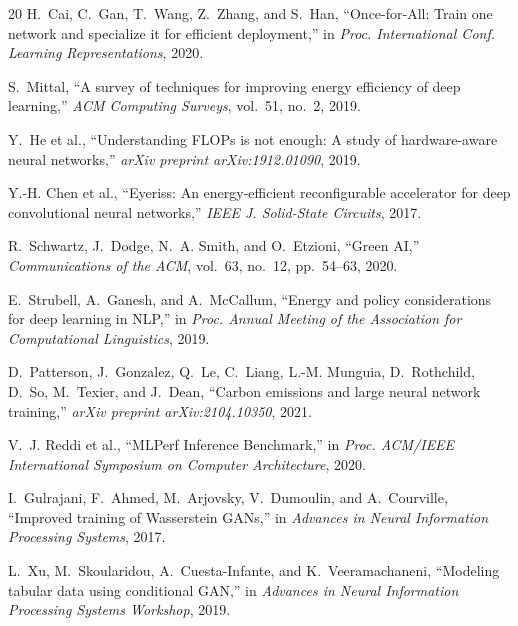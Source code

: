 \documentclass{svproc}
\begin{document}
\begin{thebibliography}{20}
H.~Cai, C.~Gan, T.~Wang, Z.~Zhang, and S.~Han, ``Once-for-All: Train one
network and specialize it for efficient deployment,'' in \emph{Proc.
International Conf. Learning Representations}, 2020.

S.~Mittal, ``A survey of techniques for improving energy efficiency of deep
learning,'' \emph{ACM Computing Surveys}, vol.~51, no.~2, 2019.

Y.~He et al., ``Understanding FLOPs is not enough: A study of hardware-aware
neural networks,'' \emph{arXiv preprint arXiv:1912.01090}, 2019.

Y.-H. Chen et al., ``Eyeriss: An energy-efficient reconfigurable accelerator
for deep convolutional neural networks,'' \emph{IEEE J. Solid-State Circuits},
2017.

R.~Schwartz, J.~Dodge, N.~A. Smith, and O.~Etzioni, ``Green AI,''
\emph{Communications of the ACM}, vol.~63, no.~12, pp.~54--63, 2020.

E.~Strubell, A.~Ganesh, and A.~McCallum, ``Energy and policy considerations
for deep learning in NLP,'' in \emph{Proc. Annual Meeting of the Association
for Computational Linguistics}, 2019.

D.~Patterson, J.~Gonzalez, Q.~Le, C.~Liang, L.-M. Munguia, D.~Rothchild,
D.~So, M.~Texier, and J.~Dean, ``Carbon emissions and large neural network
training,'' \emph{arXiv preprint arXiv:2104.10350}, 2021.

V.~J. Reddi et al., ``MLPerf Inference Benchmark,'' in \emph{Proc. ACM/IEEE
International Symposium on Computer Architecture}, 2020.

I.~Gulrajani, F.~Ahmed, M.~Arjovsky, V.~Dumoulin, and A.~Courville,
``Improved training of Wasserstein GANs,'' in \emph{Advances in Neural
Information Processing Systems}, 2017.

L.~Xu, M.~Skoularidou, A.~Cuesta-Infante, and K.~Veeramachaneni, ``Modeling
tabular data using conditional GAN,'' in \emph{Advances in Neural Information
Processing Systems Workshop}, 2019.

\end{thebibliography}
\end{document}

